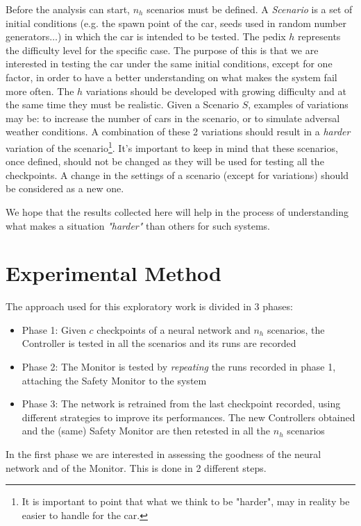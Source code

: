 Before the analysis can start, $n_{h}$ scenarios must be defined. A \textsl{Scenario} is a set of initial conditions (e.g. the spawn point of the car, seeds used in random number generators$\dots$) in which the car is intended to be tested. The pedix $h$ represents the difficulty level for the specific case. The purpose of this is that we are interested in testing the car under the same initial conditions, except for one factor, in order to have a better understanding on what makes the system fail more often. The $h$ variations should be developed with growing difficulty and at the same time they must be realistic. Given a Scenario $S$, examples of variations may be: to increase the number of cars in the scenario, or to simulate adversal weather conditions. A combination of these 2 variations should result in a \textsl{harder} variation of the scenario\footnote{It is important to point that what we think to be "harder", may in reality be easier to handle for the car.}. It's important to keep in mind that these scenarios, once defined, should not be changed as they will be used for testing all the checkpoints. A change in the settings of a scenario (except for variations) should be considered as a new one.

We hope that the results collected here will help in the process of understanding what makes a situation \textsl{"harder"} than others for such systems.

\section{Experimental Method}

The approach used for this exploratory work is divided in 3 phases:

\begin{itemize}
	\item Phase 1: Given $c$ checkpoints of a neural network and $n_{h}$ scenarios, the Controller is tested in all the scenarios and its runs are recorded
	\item Phase 2: The Monitor is tested by \textsl{repeating} the runs recorded in phase 1, attaching the Safety Monitor to the system
	\item Phase 3: The network is retrained from the last checkpoint recorded, using different strategies to improve its performances. The new Controllers obtained and the (same) Safety Monitor are then retested in all the $n_{h}$ scenarios
\end{itemize}


In the first phase we are interested in assessing the goodness of the neural network and of the Monitor. This is done in 2 different steps. 

